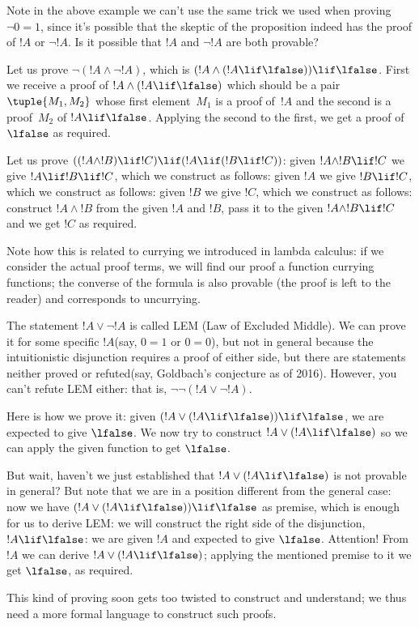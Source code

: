 \documentclass[../../../include/open-logic-section]{subfiles}
\begin{document}
Note in the above example we can't use the same trick we used when proving
$\lnot 0=1$, since it's possible that the skeptic of the proposition
indeed has the proof of $!A$ or $\lnot !A$. Is it possible that $!A$
and $\lnot !A$ are both provable? 

\begin{ex}
Let us prove $\lnot(!A \land \lnot !A)$, which is $(!A \land (!A \lif
\lfalse)) \lif \lfalse$. First we receive a proof of $!A \land (!A
\lif \lfalse)$ which should be a pair~$\tuple{M_1, M_2}$ whose first
element~$M_1$ is a proof of~$!A$ and the second is a proof~$M_2$ of
$!A \lif \lfalse$. Applying the second to the first, we get a proof
of~$\lfalse$ as required.
\end{ex}

\begin{ex}
Let us prove $((!A \land !B) \lif !C) \lif (!A \lif (!B \lif !C))$:
given $!A \land !B \lif !C$ we give $!A \lif !B \lif !C$, which we
construct as follows: given $!A$ we give $!B \lif !C$, which we
construct as follows: given $!B$ we give $!C$, which we construct as
follows: construct $!A \land !B$ from the given $!A$ and $!B$, pass it
to the given $!A \land !B \lif !C$ and we get $!C$ as required.
\end{ex}

Note how this is related to currying we introduced in lambda
calculus: if we consider the actual proof terms, we will find our
proof a function currying functions; the converse of the formula is also
provable (the proof is left to the reader) and corresponds to uncurrying.

The statement $!A \lor \lnot !A$ is called LEM (Law of Excluded
Middle). We can prove it for some specific $!A$(say,
$0=1$ or $0=0$), but not in general because the
intuitionistic disjunction requires a proof of either side, but there
are statements neither proved or refuted(say, Goldbach's conjecture as
of 2016). However, you can't refute LEM either: that is, $\lnot
\lnot (!A \lor \lnot !A)$.

\begin{ex}
Here is how we prove it: given $(!A \lor (!A \lif \lfalse))\lif
\lfalse$, we are expected to give $\lfalse$. We now try to construct
$!A \lor (!A \lif \lfalse)$ so we can apply the given function to get
$\lfalse$.

But wait, haven't we just established that $!A \lor (!A \lif \lfalse)$
is not provable in general? But note that we are in a position
different from the general case: now we have $(!A \lor (!A \lif
\lfalse))\lif \lfalse$ as premise, which is enough for us to derive
LEM: we will construct the right side of the disjunction, $!A \lif
\lfalse$: we are given $!A$ and expected to give $\lfalse$. Attention!
From $!A$ we can derive $!A \lor (!A \lif \lfalse)$; applying the
mentioned premise to it we get $\lfalse$, as required.
\end{ex}

This kind of proving soon gets too twisted to construct and understand;
we thus need a more formal language to construct such proofs.
\end{document}
